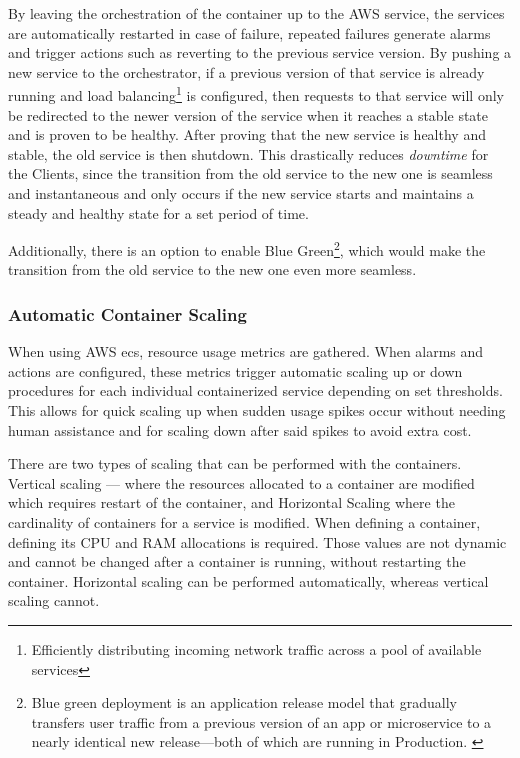 By leaving the orchestration of the container up to the AWS service, the services are automatically restarted in case of failure, repeated failures generate alarms and trigger actions such as reverting to the previous service version. By pushing a new service to the orchestrator, if a previous version of that service is already running and load balancing\footnote{Efficiently distributing incoming network traffic across a pool of available services\label{foot:load-balancing}} is configured, then requests to that service will only be redirected to the newer version of the service when it reaches a stable state and is proven to be healthy. After proving that the new service is healthy and stable, the old service is then shutdown.
This drastically reduces \textit{downtime} for the Clients, since the transition from the old service to the new one is seamless and instantaneous and only occurs if the new service starts and maintains a steady and healthy state for a set period of time.

Additionally, there is an option to enable Blue Green\footnote{Blue green deployment is an application release model that gradually transfers user traffic from a previous version of an app or microservice to a nearly identical new release—both of which are running in Production. \label{foot:blue-green}}, which would make the transition from the old service to the new one even more seamless.

\subsubsection{Automatic Container Scaling}\label{methodology:sss:automatic-container-scaling}

When using AWS \gls{ecs}, resource usage metrics are gathered. When alarms and actions are configured, these metrics trigger automatic scaling up or down procedures for each individual containerized service depending on set thresholds. This allows for quick scaling up when sudden usage spikes occur without needing human assistance and for scaling down after said spikes to avoid extra cost.

There are two types of scaling that can be performed with the containers. Vertical scaling --- where the resources allocated to a container are modified which requires restart of the container, and Horizontal Scaling where the cardinality of containers for a service is modified. When defining a container, defining its CPU and RAM allocations is required. Those values are not dynamic and cannot be changed after a container is running, without restarting the container. Horizontal scaling can be performed automatically, whereas vertical scaling cannot.

